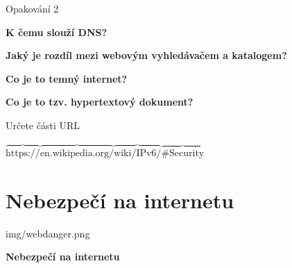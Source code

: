 \documentclass[aspectratio=1610]{beamer}
\begin{document}
\begin{frame}{Opakování 2}
    \begin{cardTiny}
        \begin{center}
            \textbf{K čemu slouží DNS?}
        \end{center}
    \end{cardTiny}
    \begin{cardTiny}
        \begin{center}
            \textbf{Jaký je rozdíl mezi webovým vyhledávačem a katalogem?}
        \end{center}
    \end{cardTiny}
    \begin{cardTiny}
        \begin{center}
            \textbf{Co je to temný internet?}
        \end{center}
    \end{cardTiny}
    \begin{cardTiny}
        \begin{center}
            \textbf{Co je to tzv. hypertextový dokument?}
        \end{center}
    \end{cardTiny}
\end{frame}

\begin{frame}{Určete části URL} 
    \begin{cardTiny}
        \begin{center}
            $ \overbrace{\text{https://}}^{\text{ }}
            \overbrace{\text{en.wikipedia.org/}}^{\text{ }}
            \overbrace{\text{wiki/IPv6/}}^{\text{ }}
            \overbrace{\text{\#Security}}^{\text{ }} $
        \end{center}
    \end{cardTiny}
\end{frame}



\section{Nebezpečí na internetu}

\begin{frameImg}[width]{img/webdanger.png}
    \vspace*{60mm}
    \begin{cardTiny}
        \vspace*{\fill}
        \begin{center}
            \textbf{Nebezpečí na internetu}
        \end{center}
    \end{cardTiny}
\end{frameImg}
\end{document}
